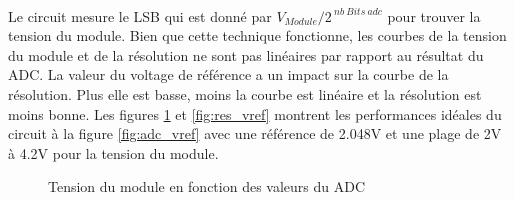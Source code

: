 	\paragraph*{}
	Le circuit mesure le LSB qui est donné par $V_{Module} / 2^{~nb~Bits~adc}$ pour  trouver la tension du module. Bien que cette technique fonctionne, les courbes de la tension du module et de la résolution ne sont pas linéaires par rapport au résultat du ADC. La valeur du voltage de référence a un impact sur la courbe de la résolution. Plus elle est basse, moins la courbe est linéaire et la résolution est moins bonne. Les figures \ref{fig:vmodule_vref} et \ref{fig:res_vref} montrent les performances idéales du circuit à la figure \ref{fig:adc_vref} avec une référence de 2.048V et une plage de 2V à 4.2V pour la tension du module.

	\begin{figure}[H]
		\begin{minipage}{0.45\textwidth}
			\centering
			\caption{Tension du module en fonction des valeurs du ADC}
			\label{fig:vmodule_vref}
		\end{minipage}
		\hfill
		\begin{minipage}{0.45\textwidth}
			\centering

\end{minipage}
\end{figure}
